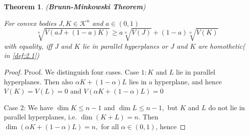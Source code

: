 \documentclass[oneside]{book}
\newtheorem{theorem}{Theorem}[section]
\theoremstyle{definition}
\begin{document}
 
 \begin{theorem}
 \label{t:11}
 (\textbf{Brunn-Minkowski Theorem})
 
For convex bodies $J, K \in \mathcal{K}^{n}$ and $a \in(0,1)$
\begin{equation}
\label{eq54}
\sqrt[n]{V(a J+(1-a) K)} \geq a \sqrt[n]{V(J)}+(1-a) \sqrt[n]{V(K)}
\end{equation} \label{eq:4.19}
with equality, iff $J$ and $K$ lie in parallel hyperplanes or $J$ and $K$ are homothetic( in \ref{def:2.1})
  \end{theorem}
\begin{proof}


Proof. We distinguish four cases.
Case $1: K$ and $L$ lie in parallel hyperplanes. Then also $\alpha K+(1-\alpha) L$ lies in a hyperplane, and hence $V(K)=V(L)=0$ and $V(\alpha K+(1-\alpha) L)=0$

Case 2: We have $\operatorname{dim} K \leq n-1$ and $\operatorname{dim} L \leq n-1,$ but $K$ and $L$ do not lie in parallel hyperplanes, i.e. $\operatorname{dim}(K+L)=n .$ Then $\operatorname{dim}(\alpha K+(1-\alpha) L)=n,$ for all $\alpha \in(0,1)$, hence
 
 

 \end{proof}
 
 
 
 

 
 
 
 
 

     
       

       
       
       
       
       
       
       
       
       
       
       
       
       
       
       
       
       
       
       
       
       
       
       
       
       
       
       
       
       
       
       
       
       
       
       
       
       
       
       
       
       
       
       
       
       
       
       
       
       
       
       
       
       
       
       
       
       
       
       
       
       
       
       
       
       
       
       
       
       
       
     
\end{document}
